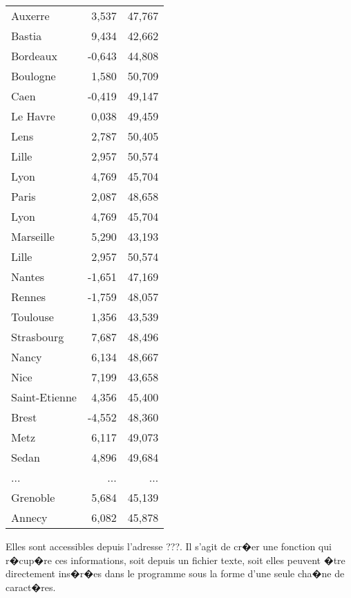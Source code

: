 \begin{xexercicenot}
\begin{center}\begin{footnotesize}\begin{tabular}{|lrr|} \hline
Auxerre	&	 3,537  	&	 47,767  	\\ 
Bastia	&	 9,434  	&	 42,662  	\\ 
Bordeaux	&	-0,643  	&	 44,808  	\\ 
Boulogne	&	 1,580  	&	 50,709  	\\ 
\if 0
Caen	&	-0,419  	&	 49,147  	\\ 
Le Havre	&	 0,038  	&	 49,459  	\\ 
Lens	&	 2,787  	&	 50,405  	\\ 
Lille	&	 2,957  	&	 50,574  	\\ 
Lyon	&	 4,769  	&	 45,704  	\\ 
Paris	&	 2,087  	&	 48,658  	\\ 
Lyon	&	 4,769  	&	 45,704  	\\ 
Marseille	&	 5,290  	&	 43,193  	\\ 
Lille	&	 2,957  	&	 50,574  	\\ 
Nantes	&	-1,651  	&	 47,169  	\\ 
Rennes	&	-1,759  	&	 48,057  	\\ 
Toulouse	&	 1,356  	&	 43,539  	\\ 
Strasbourg	&	 7,687  	&	 48,496  	\\ 
Nancy	&	 6,134  	&	 48,667  	\\ 
Nice	&	 7,199  	&	 43,658  	\\ 
Saint-Etienne	&	 4,356  	&	 45,400  	\\ 
Brest	&	-4,552  	&	 48,360  	\\ 
Metz	&	 6,117  	&	 49,073  	\\ 
Sedan	&	 4,896  	&	 49,684  	\\ 
\fi 
... & ... & ... \\
Grenoble	&	 5,684  	&	 45,139  	\\ 
Annecy	&	 6,082  	&	 45,878  	\\  \hline
\end{tabular}\end{footnotesize}\end{center}

Elles sont accessibles depuis l'adresse ???. Il s'agit de cr�er une fonction qui r�cup�re ces informations, soit depuis un fichier texte, soit elles peuvent �tre directement ins�r�es dans le programme sous la forme d'une seule cha�ne de caract�res. 


\end{xexercicenot}
